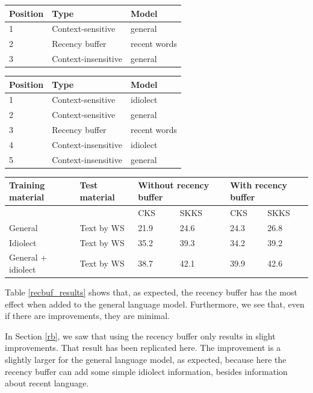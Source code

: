 \documentclass[11pt]{article}
\let\originaltable\table
\let\endoriginaltable\endtable
\renewenvironment{table}[1][ht]{%
  \originaltable[#1]
  \centering}%
  {\endoriginaltable}
\begin{document}
\begin{table}[H]
\begin{tabular}{lll} 
Position&Type&Model\\
\hline
1&Context-sensitive&general\\
2&Recency buffer&recent words\\
3&Context-insensitive&general\\
\end{tabular} 
\caption{The module order for simulation 2, with the general model and the recency buffer} 
\end{table}

\begin{table}[H]
\begin{tabular}{lll} 
Position&Type&Model\\
\hline
1&Context-sensitive&idiolect\\
2&Context-sensitive&general\\
3&Recency buffer&recent words\\
4&Context-insensitive&idiolect\\
5&Context-insensitive&general\\
\end{tabular} 
\caption{The module order for simulation 3, with the idiolect model, the general model and the recency buffer} \label{sim3}
\end{table}


\begin{table}[H] 
\centering
\begin{tabular}{ll|llll} 
Training material&Test material&\multicolumn{2}{l}{Without recency buffer}&\multicolumn{2}{l}{With recency buffer}\\
\hline
&&CKS&SKKS&CKS&SKKS\\
General&Text by WS&21.9&24.6&24.3&26.8\\
Idiolect&Text by WS&35.2&39.3&34.2&39.2\\
General + idiolect&Text by WS&38.7&42.1&39.9&42.6\\
\end{tabular} 
\caption{Percentage of keystrokes that can be saved with and without the recency buffer} \label{recbuf_results}
\end{table}

Table \ref{recbuf_results} shows that, as expected, the recency buffer has the most effect when added to the general language model. Furthermore, we see that, even if there are improvements, they are minimal.

In Section \ref{rb}, we saw that using the recency buffer only results in slight improvements. That result has been replicated here. The improvement is a slightly larger for the general language model, as expected, because here the recency buffer can add some simple idiolect information, besides information about recent language.
\end{document}
